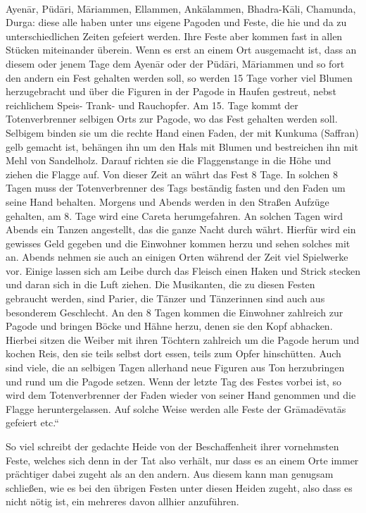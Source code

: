 \documentclass{article}
\begin{document}
\paragraph{}
Ayen\={a}r, Püd\={a}ri, M\={a}riammen, Ellammen, Ank\={a}lammen, Bhadra-K\={a}li, Chamunda, Durga: diese alle haben unter uns eigene Pagoden und Feste, die hie und da zu unterschiedlichen Zeiten gefeiert werden. Ihre Feste aber kommen fast in allen Stücken miteinander überein. Wenn es erst an einem Ort ausgemacht ist, dass an diesem oder jenem Tage dem Ayen\={a}r oder der Püd\={a}ri, M\={a}riammen und so fort den andern ein Fest gehalten werden soll, so werden 15 Tage vorher viel Blumen herzugebracht und über die Figuren in der Pagode in Haufen gestreut, nebst reichlichem Speis- Trank- und Rauchopfer. Am 15. Tage kommt der Totenverbrenner selbigen Orts zur Pagode, wo das Fest gehalten werden soll. Selbigem binden sie um die rechte Hand einen Faden, der mit Kunkuma (Saffran) gelb gemacht ist, behängen ihn um den Hals mit Blumen und bestreichen ihn mit Mehl von Sandelholz. Darauf richten sie die Flaggenstange in die Höhe und ziehen die Flagge auf. Von dieser Zeit an währt das Fest 8 Tage. In solchen 8 Tagen muss der Totenverbrenner des Tags beständig fasten und den Faden um seine Hand behalten. Morgens und Abends werden in den Straßen Aufzüge gehalten, am 8. Tage wird eine Careta herumgefahren. An solchen Tagen wird Abends ein Tanzen angestellt, das die ganze Nacht durch währt. Hierfür wird ein gewisses Geld gegeben und die Einwohner kommen herzu und sehen solches mit an. Abends nehmen sie auch an einigen Orten während der Zeit viel Spielwerke vor. Einige lassen sich am Leibe durch das Fleisch einen Haken und Strick stecken und daran sich in die Luft ziehen. Die Musikanten, die zu diesen Festen gebraucht werden, sind Parier, die Tänzer und Tänzerinnen sind auch aus besonderem Geschlecht. An den 8 Tagen kommen die Einwohner zahlreich zur Pagode und bringen Böcke und Hähne herzu, denen sie den Kopf abhacken. Hierbei sitzen die Weiber mit ihren Töchtern zahlreich um die Pagode herum und kochen Reis, den sie teils selbst dort essen, teils zum Opfer hinschütten. Auch sind viele, die an selbigen Tagen allerhand neue Figuren aus Ton herzubringen und rund um die Pagode setzen. Wenn der letzte Tag des Festes vorbei ist, so wird dem Totenverbrenner der Faden wieder von seiner Hand genommen und die Flagge heruntergelassen. Auf solche Weise werden alle Feste der Gr\={a}mad\={e}vat\={a}s gefeiert etc.“

So viel schreibt der gedachte Heide von der Beschaffenheit ihrer vornehmsten Feste, welches sich denn in der Tat also verhält, nur dass es an einem Orte immer prächtiger dabei zugeht als an den andern. Aus diesem kann man genugsam schließen, wie es bei den übrigen Festen unter diesen Heiden zugeht, also dass es nicht nötig ist, ein mehreres davon allhier anzuführen.
\end{document}
